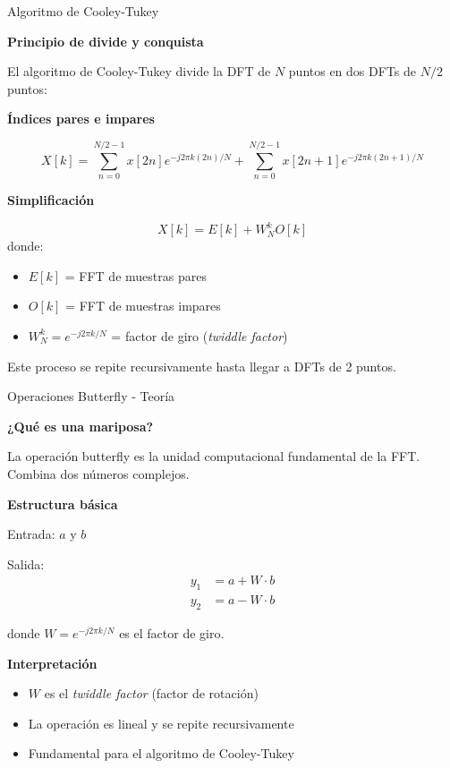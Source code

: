 \documentclass[aspectratio=169]{beamer}
\begin{document}
\begin{frame}{Algoritmo de Cooley-Tukey}

\textbf{Principio de divide y conquista}

El algoritmo de Cooley-Tukey divide la DFT de $N$ puntos en dos DFTs de $N/2$ puntos:

\textbf{Índices pares e impares}

\[
X[k] = \sum_{n=0}^{N/2-1} x[2n]e^{-j2\pi k(2n)/N} + \sum_{n=0}^{N/2-1} x[2n+1]e^{-j2\pi k(2n+1)/N}
\]

\textbf{Simplificación}

\[
X[k] = E[k] + W_N^k O[k]
\]
donde:
\begin{itemize}
    \item $E[k]$ = FFT de muestras pares
    \item $O[k]$ = FFT de muestras impares
    \item $W_N^k = e^{-j2\pi k/N}$ = factor de giro (\textit{twiddle factor})
\end{itemize}

Este proceso se repite recursivamente hasta llegar a DFTs de 2 puntos.

\end{frame}

\begin{frame}{Operaciones Butterfly - Teoría}

\textbf{¿Qué es una mariposa?}

La operación butterfly es la unidad computacional fundamental de la FFT. Combina dos números complejos.

\vspace{0.3cm}

\textbf{Estructura básica}

Entrada: $a$ y $b$

Salida:
\[
\begin{aligned}
y_1 &= a + W \cdot b \\
y_2 &= a - W \cdot b
\end{aligned}
\]

donde $W = e^{-j2\pi k/N}$ es el factor de giro.

\vspace{0.3cm}

\textbf{Interpretación}

\begin{itemize}
    \item $W$ es el \textit{twiddle factor} (factor de rotación)
    \item La operación es lineal y se repite recursivamente
    \item Fundamental para el algoritmo de Cooley-Tukey
\end{itemize}

\end{frame}
\end{document}
